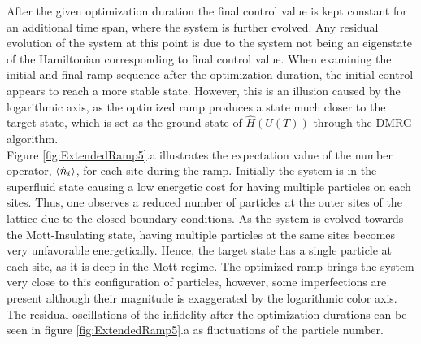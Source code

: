 After the given optimization duration the final control value is kept constant for an additional time span, where the system is further evolved. Any residual evolution of the system at this point is due to the system not being an eigenstate of the Hamiltonian corresponding to final control value. When examining the initial and final ramp sequence after the optimization duration, the initial control appears to reach a more stable state. However, this is an illusion caused by the logarithmic axis, as the optimized ramp produces a state much closer to the target state, which is set as the ground state of $\hat{H}(U(T))$ through the DMRG algorithm.\\ 
Figure \ref{fig:ExtendedRamp5}.a illustrates the expectation value of the number operator, $\braket{\hat{n}_i}$, for each site during the ramp. Initially the system is in the superfluid state causing a low energetic cost for having multiple particles on each sites. Thus, one observes a reduced number of particles at the outer sites of the lattice due to the closed boundary conditions. As the system is evolved towards the Mott-Insulating state, having multiple particles at the same sites becomes very unfavorable energetically. Hence, the target state has a single particle at each site, as it is deep in the Mott regime. The optimized ramp brings the system very close to this configuration of particles, however, some imperfections are present although their magnitude is exaggerated by the logarithmic color axis. The residual oscillations of the infidelity after the optimization durations can be seen in figure \ref{fig:ExtendedRamp5}.a as fluctuations of the particle number. 


